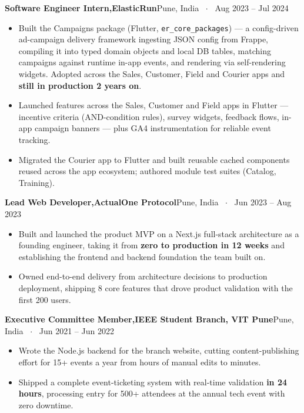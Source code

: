 \documentclass[a4paper,10pt]{article}
\newcommand{\role}[3]{%
  \vspace{5pt}%
  {\normalsize\bfseries #1}\;\textcolor{accent2}{\bfseries #2}\hfill{\small\color{muted}#3}%
  \par\vspace{1pt}}
\begin{document}
\role{Software Engineer Intern,}{ElasticRun}{Pune, India \, $\cdot$ \, Aug 2023 -- Jul 2024}
\begin{itemize}
  \item Built the Campaigns package (Flutter, \texttt{er\_core\_packages}) --- a config-driven ad-campaign delivery framework ingesting JSON config from Frappe, compiling it into typed domain objects and local DB tables, matching campaigns against runtime in-app events, and rendering via self-rendering widgets. Adopted across the Sales, Customer, Field and Courier apps and \textbf{still in production 2 years on}.
  \item Launched features across the Sales, Customer and Field apps in Flutter --- incentive criteria (AND-condition rules), survey widgets, feedback flows, in-app campaign banners --- plus GA4 instrumentation for reliable event tracking.
  \item Migrated the Courier app to Flutter and built reusable cached components reused across the app ecosystem; authored module test suites (Catalog, Training).
\end{itemize}

\role{Lead Web Developer,}{ActualOne Protocol}{Pune, India \, $\cdot$ \, Jun 2023 -- Aug 2023}
\begin{itemize}
  \item Built and launched the product MVP on a Next.js full-stack architecture as a founding engineer, taking it from \textbf{zero to production in 12 weeks} and establishing the frontend and backend foundation the team built on.
  \item Owned end-to-end delivery from architecture decisions to production deployment, shipping 8 core features that drove product validation with the first 200 users.
\end{itemize}

\role{Executive Committee Member,}{IEEE Student Branch, VIT Pune}{Pune, India \, $\cdot$ \, Jun 2021 -- Jun 2022}
\begin{itemize}
  \item Wrote the Node.js backend for the branch website, cutting content-publishing effort for 15+ events a year from hours of manual edits to minutes.
  \item Shipped a complete event-ticketing system with real-time validation \textbf{in 24 hours}, processing entry for 500+ attendees at the annual tech event with zero downtime.
\end{itemize}

\end{document}
